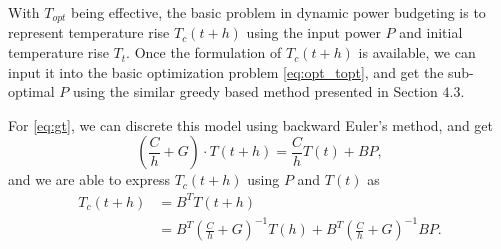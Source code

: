 




With $T_{opt}$ being effective, the basic problem in dynamic power budgeting is to represent temperature rise $T_{c}(t+h)$ using the input power $P$ and initial temperature rise $T_{t}$. Once the formulation of $T_{c}(t+h)$ is available, we can input it into the basic optimization problem \eqref{eq:opt_topt}, and get the sub-optimal $P$ using the similar greedy based method presented in Section $4.3$.

For \eqref{eq:gt}, we can discrete this model using backward Euler's method, and get
\begin{equation}\label{eq:discrete_gt}
(\frac{C}{h}+G)\cdot T(t+h)=\frac{C}{h}T(t)+BP,
\end{equation}
and we are able to express $T_{c}(t+h)$ using $P$ and $T(t)$ as
\begin{equation}\label{eq:discrete_gt}
  \begin{split}
T_{c}(t+h)&=B^{T}T(t+h)\\
&=B^{T}(\frac{C}{h}+G)^{-1}T(h)+B^{T}(\frac{C}{h}+G)^{-1}BP.
  \end{split}
\end{equation}

